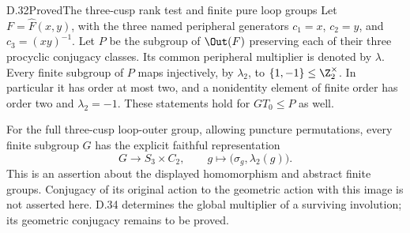 \begin{claim}{D.32}{Proved}{The three-cusp rank test and finite pure loop groups}
Let $F=\widehat F(x,y)$, with the three named peripheral generators
$c_1=x$, $c_2=y$, and $c_3=(xy)^{-1}$.  Let $P$ be the subgroup of
$\Out(F)$ preserving each of their three procyclic conjugacy classes.
Its common peripheral multiplier is denoted by $\lambda$.
Every finite subgroup of $P$ maps injectively, by $\lambda_2$, to
$\{1,-1\}\leq\Z_2^\times$.  In particular it has order at most two,
and a nonidentity element of finite order has order two and
$\lambda_2=-1$.  These statements hold for $GT_0\leq P$ as well.

For the full three-cusp loop-outer group, allowing puncture permutations,
every finite subgroup $G$ has the explicit faithful representation
\[
 G\longrightarrow S_3\times C_2,\qquad
       g\longmapsto\bigl(\sigma_g,\lambda_2(g)\bigr).
                                                        \tag{D.32a}
\]
This is an assertion about the displayed homomorphism and abstract
finite groups.  Conjugacy of its original action to the geometric
action with this image is not asserted here. D.34 determines the
global multiplier of a surviving involution; its geometric conjugacy
remains to be proved.
\end{claim}
